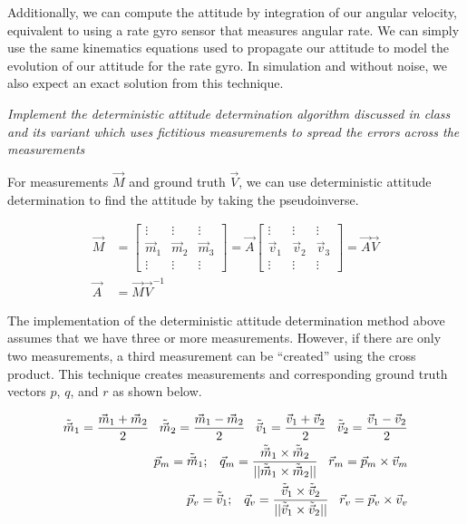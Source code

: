Additionally, we can compute the attitude by integration of our angular velocity, equivalent to using a rate gyro sensor that measures angular rate. We can simply use the same kinematics equations used to propagate our attitude to model the evolution of our attitude for the rate gyro. In simulation and without noise, we also expect an exact solution from this technique.

\textit{Implement the deterministic attitude determination algorithm discussed in class and its variant which uses fictitious measurements to spread the errors across the measurements}

For measurements $\Vec{M}$ and ground truth $\Vec{V}$, we can use deterministic attitude determination to find the attitude by taking the pseudoinverse.

\begin{align*}
    \Vec{M} &= 
    \begin{bmatrix}
        \vdots & \vdots & \vdots\\
        \Vec{m}_{1} & \Vec{m}_{2} & \Vec{m}_{3}\\
        \vdots & \vdots & \vdots
    \end{bmatrix} =
    \Vec{A} \begin{bmatrix}
        \vdots & \vdots & \vdots\\
        \Vec{v}_{1} & \Vec{v}_{2} & \Vec{v}_{3}\\
        \vdots & \vdots & \vdots
    \end{bmatrix} =
    \Vec{A} \Vec{V} \\
    \Vec{A} &= \Vec{M} \Vec{V}^{-1}
\end{align*}

The implementation of the deterministic attitude determination method above assumes that we have three or more measurements. However, if there are only two measurements, a third measurement can be ``created'' using the cross product. This technique creates measurements and corresponding ground truth vectors $p$, $q$, and $r$ as shown below.

\begin{align*}
    \Tilde{\Vec{{m}}}_1 = \frac{\Vec{m}_1 + \Vec{m}_2}{2} \;\;\;
    \Tilde{\Vec{{m}}}_2 = \frac{\Vec{m}_1 - \Vec{m}_2}{2} \;\;\;
    \Tilde{\Vec{{v}}}_1 = \frac{\Vec{v}_1 + \Vec{v}_2}{2} \;\;\;
    \Tilde{\Vec{{v}}}_2 = \frac{\Vec{v}_1 - \Vec{v}_2}{2} \\
    \Vec{p}_m = \Tilde{\Vec{{m}}}_1; \;\;\;
    \Vec{{q}}_m = \frac{\Tilde{\Vec{{m}}}_1 \times \Tilde{\Vec{{m}}}_2}{||\Tilde{\Vec{{m}}}_1 \times \Tilde{\Vec{{m}}}_2||} \;\;\;
    \Vec{{r}}_m = \Vec{p}_m \times \Vec{v}_m \\
    \Vec{p}_v = \Tilde{\Vec{{v}}}_1; \;\;\;
    \Vec{{q}}_v = \frac{\Tilde{\Vec{{v}}}_1 \times \Tilde{\Vec{{v}}}_2}{||\Tilde{\Vec{{v}}}_1 \times \Tilde{\Vec{{v}}}_2||} \;\;\;
    \Vec{{r}}_v = \Vec{p}_v \times \Vec{v}_v \\
\end{align*}

